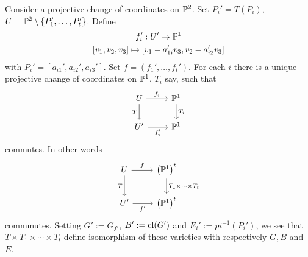     \begin{lemma}
        Consider a projective change of coordinates on $\mathbb{P}^2$. Set $P_i' = T(P_i)$, $U=\mathbb{P}^2\setminus \{P_1',\dots,P_t'\}$. Define 
        \begin{gather*}
            f_i': U'\rightarrow \mathbb{P}^1\\
            [v_1,v_2,v_3]\mapsto \left[v_1-a_{1i}'v_3,v_2-a_{i2}'v_3\right]
        \end{gather*}
        with $P_i' = [a_{i1}',a_{i2}',a_{i3}']$. Set $f=(f_1',\dots,f_t')$. For each $i$ there is a unique projective change of coordinates on $\mathbb{P}^1$, $T_i$ say, such that 
        $$
            \begin{tikzcd}
                U \arrow[r,"f_i"] \arrow[d,"T",swap] & \Pp^1 \arrow[d,"T_i"]\\
                U' \arrow[r,"f_i'",swap] & \Pp^1
            \end{tikzcd}
        $$
        commutes. In other words 
        $$
            \begin{tikzcd}
                U \arrow[r,"f"] \arrow[d,"T",swap] & \left(\Pp^1\right)^t \arrow[d,"T_1\times\cdots \times T_t"]\\
                U' \arrow[r,"f'",swap] & \left(\Pp^1\right)^t
            \end{tikzcd}
        $$
        commmutes. Setting $G':= G_{f'}$, $B':= \mathrm{cl}(G')$ and $E_i' := pi^{-1}(P_i')$, we see that $T\times T_1\times \cdots \times T_t$ define isomorphism of these varieties with respectively $G,B$ and $E$.
    \end{lemma}
